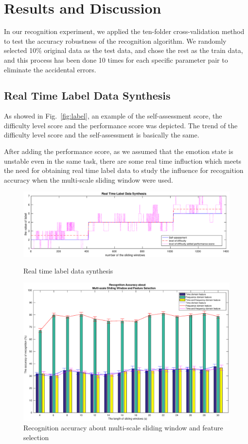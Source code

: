\documentclass[runningheads,a4paper]{llncs}
\begin{document}
\section{Results and Discussion}
In our recognition experiment, we applied the ten-folder cross-validation method
to test the accuracy robustness of the recognition algorithm. We randomly selected
10\% original data as the test data, and chose the rest as the train data, and this
process has been done 10 times for each specific parameter pair to eliminate the
accidental errors.
\subsection{Real Time Label Data Synthesis }
As showed in Fig.~\ref{fig:label}, an example of the self-assessment score,
the difficulty level score and the performance score was depicted.
The trend of the difficulty level score and the self-assessment is basically
the same.

After adding the performance score, as we assumed that the emotion state
is unstable even in the same task, there are some real time influction which
meets the need for obtaining real time label data to study the influence for recognition
accuracy when the multi-scale sliding window were used.

\begin{figure}
  \centering
  \includegraphics[width=12cm]{images/16}
  \caption{Real time label data synthesis}
  \label{fig:label}
%
  \centering
  \includegraphics[width=18cm,angle=90]{17}
  \caption{Recognition accuracy about multi-scale sliding window and feature selection}
  \label{fig:sliding}
\end{figure}
\end{document}

